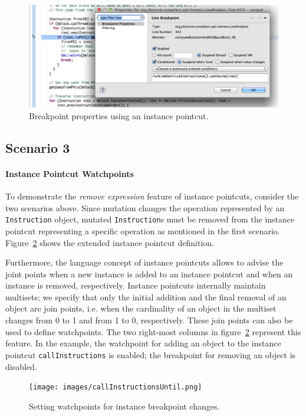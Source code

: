 \documentclass{sig-alternate}
\begin{document}
\begin{figure}
\centering
\includegraphics[scale=0.7]{images/breakpointProperties.png}
\caption{Breakpoint properties using an instance pointcut.}
\label{fig:breakpoint-properties}
\end{figure}

\subsection{Scenario 3}

\paragraph{Instance Pointcut Watchpoints}

To demonstrate the \emph{remove expression} feature of instance pointcuts, consider the two scenarios above.
Since mutation changes the operation represented by an \lstinline!Instruction! object, mutated \lstinline!Instruction!s must be removed from the instance pointcut representing a specific operation as mentioned in the first scenario.
Figure~\ref{fig:ip-watchpoints} shows the extended instance pointcut definition.

Furthermore, the language concept of instance pointcuts allows to advise the joint points when a new instance is added to an instance pointcut and when an instance is removed, respectively.
Instance pointcuts internally maintain multisets; we specify that only the initial addition and the final removal of an object are join points, i.e. when the cardinality of an object in the multiset changes from 0 to 1 and from 1 to 0, respectively.
These join points can also be used to define watchpoints.
The two right-most columns in figure~\ref{fig:ip-watchpoints} represent this feature.
In the example, the watchpoint for adding an object to the instance pointcut \lstinline!callInstructions! is enabled; the breakpoint for removing an object is disabled.

\begin{figure}
\centering
\texttt{[image: images/callInstructionsUntil.png]}
\caption{Setting watchpoints for instance breakpoint changes.}
\label{fig:ip-watchpoints}
\end{figure}
\end{document}
